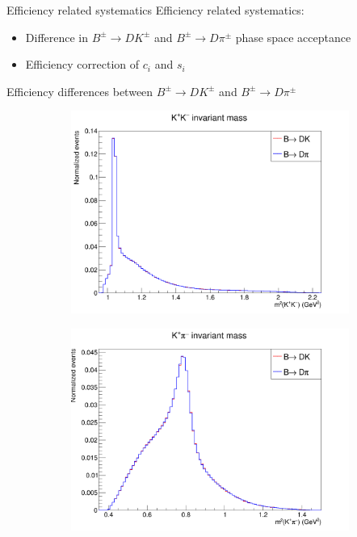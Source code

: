 \documentclass{beamer}
\begin{document}
\begin{frame}{Efficiency related systematics}
  Efficiency related systematics:
  \vspace{0.7cm}
  \begin{itemize}
    \setlength\itemsep{2em}
    \item{Difference in $B^\pm\to DK^\pm$ and $B^\pm\to D\pi^\pm$ phase space acceptance}
    \item{Efficiency correction of $c_i$ and $s_i$}
  \end{itemize}
\end{frame}

\begin{frame}{Efficiency differences between $B^\pm\to DK^\pm$ and $B^\pm\to D\pi^\pm$}
  \begin{figure}
    \centering
    \begin{subfigure}{0.33\textwidth}
      \includegraphics[width = 1.0\textwidth]{Plots/Dalitz_s01.png}
    \end{subfigure}%
    \begin{subfigure}{0.33\textwidth}
      \includegraphics[width = 1.0\textwidth]{Plots/Dalitz_s03.png}

\end{subfigure}
\end{figure}
\end{frame}
\end{document}
